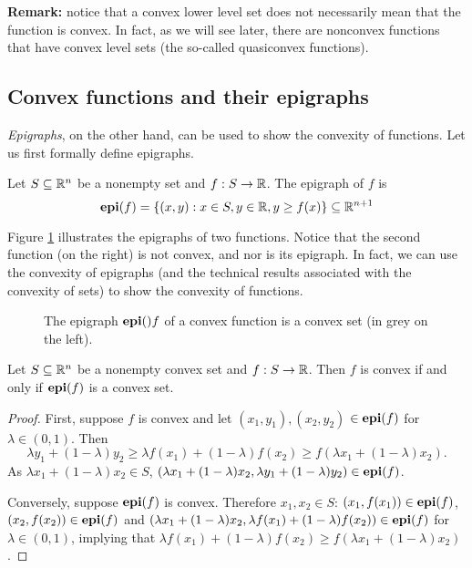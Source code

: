 {\bf Remark:} notice that a convex lower level set does not necessarily mean that the function is convex. In fact, as we will see later, there are nonconvex functions that have convex level sets (the so-called quasiconvex functions).  

\subsection{Convex functions and their epigraphs}

\emph{Epigraphs}, on the other hand, can be used to show the convexity of functions. Let us first formally define epigraphs.
%
\begin{definition}[Ephigraph]
	Let $S \subseteq \mathbb{R}^n$\hspace{-1pt} be a nonempty set and $f:S \to \mathbb{R}$.\hspace{-1pt} The epigraph of $f$ is $$ \mathop{\bf epi}(f) = \left\{ (x, y) : x \in S, y \in \mathbb{R}, y \geq f(x) \right \} \subseteq \mathbb{R}^{n+1}
$$
\end{definition}
%
Figure \ref{fig:epigraphs} illustrates the epigraphs of two functions. Notice that the second function (on the right) is not convex, and nor is its epigraph. In fact, we can use the convexity of epigraphs (and the technical results associated with the convexity of sets) to show the convexity of functions.
% 
\begin{figure}
	\caption{The epigraph $\mathop{\bf epi}()f$ of a convex function is a convex set (in grey on the left).}\label{fig:epigraphs}
\end{figure}
%
\begin{theorem}\label{thm:convex_epi}
	Let $S \subseteq \mathbb{R}^n$ be a nonempty convex set and $f:S \to \mathbb{R}$. Then $f$ is convex if and only if $\mathop{\bf epi}(f)$ is a convex set.
\end{theorem}
%
\begin{proof}
	First, suppose $f$ is convex and let $(x_1, y_1), (x_2, y_2)$ $\in \mathop{\bf epi}(f)$ for $\lambda \in (0,1)$. Then
\begin{equation*}
	\lambda y_1 + (1-\lambda)y_2 \geq \lambda f(x_1) + (1-\lambda)f(x_2) \geq f(\lambda x_1 + (1- \lambda)x_2).
\end{equation*}
As $\lambda x_1 + (1-\lambda)x_2 \in S$, $(\lambda x_1 + (1-\lambda)x_2,\lambda y_1 + (1-\lambda)y_2) \in \mathop{\bf epi}(f)$.

Conversely, suppose $\mathop{\bf epi}(f)$ is convex. Therefore $x_1, x_2 \in S$: $(x_1,f(x_1))\in \mathop{\bf epi}(f)$, $(x_2,f(x_2)) \in \mathop{\bf epi}(f)$ and $(\lambda x_1 + (1-\lambda)x_2, \lambda f(x_1) + (1-\lambda)f(x_2)) \in \mathop{\bf epi}(f)$ for $\lambda \in (0,1)$, implying that $\lambda f(x_1) + (1-\lambda)f(x_2) \geq f(\lambda x_1 + (1-\lambda)x_2)$.
\end{proof}

